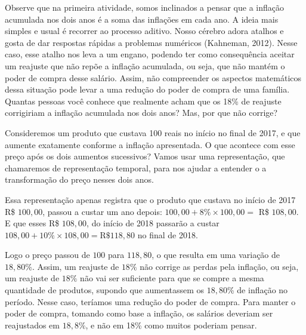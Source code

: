 
Observe que na primeira atividade, somos inclinados a pensar que a inflação acumulada nos dois anos é a soma das inflações em cada ano. A ideia mais simples e usual é recorrer ao processo aditivo. Nosso cérebro adora atalhos e gosta de dar respostas rápidas a problemas numéricos (Kahneman, 2012). Nesse caso, esse atalho nos leva a um engano, podendo ter como consequência aceitar um reajuste que não repõe a inflação acumulada, ou seja, que não mantém o poder de compra desse salário. Assim, não compreender os aspectos matemáticos dessa situação pode levar a uma redução do poder de compra de uma família. Quantas pessoas você conhece que realmente acham que os 18\% de reajuste corrigiriam a inflação acumulada nos dois anos? Mas, por que não corrige?

Consideremos um produto que custava 100 reais no início no final de 2017, e que aumente exatamente conforme a inflação apresentada. O que acontece com esse preço após os dois aumentos sucessivos? Vamos usar uma representação, que chamaremos de representação temporal, para nos ajudar a entender o a transformação do preço nesses dois anos.  

\begin{figure}[H]
\centering


\end{figure}

Essa representação apenas registra que o produto que custava no início de 2017 R\$ $100{,}00$, passou a custar um ano depois: $100{,}00 + 8\%\times100{,}00 =$ R\$ $108{,}00$. E que esses R\$ $108{,}00$, do início de 2018 passarão a custar $108{,}00 + 10\% \times 108{,}00 = \text{R\$ } 118{,}80$ no final de 2018. 

Logo o preço passou de $100$ para $118{,}80$, o que resulta em uma variação de $18{,}80\%$. Assim, um reajuste de $18\%$ não corrige as perdas pela inflação, ou seja, um reajuste de $18\%$ não vai ser suficiente para que se compre a mesma quantidade de produtos, supondo que aumentassem os $18{,}80$\% de inflação no período. Nesse caso, teríamos uma redução do poder de compra. Para manter o poder de compra, tomando como base a inflação, os salários deveriam ser reajustados em $18{,}8\%$, e não em 18\% como muitos poderiam pensar. 

